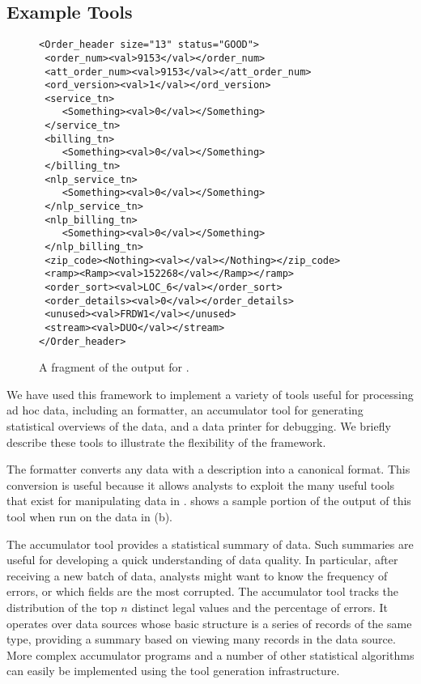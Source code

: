 \subsection{Example Tools}
\label{sec:gentool-motivation-ex}

\begin{figure}
  \centering
  \scriptsize
\begin{verbatim}
<Order_header size="13" status="GOOD">
 <order_num><val>9153</val></order_num>
 <att_order_num><val>9153</val></att_order_num>
 <ord_version><val>1</val></ord_version>
 <service_tn>
    <Something><val>0</val></Something>
 </service_tn>
 <billing_tn>
    <Something><val>0</val></Something>
 </billing_tn>
 <nlp_service_tn>
    <Something><val>0</val></Something>
 </nlp_service_tn>
 <nlp_billing_tn>
    <Something><val>0</val></Something>
 </nlp_billing_tn>
 <zip_code><Nothing><val></val></Nothing></zip_code>
 <ramp><Ramp><val>152268</val></Ramp></ramp>
 <order_sort><val>LOC_6</val></order_sort>
 <order_details><val>0</val></order_details>
 <unused><val>FRDW1</val></unused>
 <stream><val>DUO</val></stream>
</Order_header>
\end{verbatim}  
  \caption{A fragment of the \xml{} output for \dibbler{}. }
  \label{fig:gentool-xml-output}
\end{figure}

We have used this framework to implement a variety of tools useful for processing ad hoc data, including an \xml{} formatter, an accumulator tool for generating statistical overviews of the data, and a data printer for debugging.  We briefly describe these tools to illustrate the flexibility of the framework.

The \xml{} formatter converts any data with a \padsml{} description into a canonical \xml{} format.  This conversion is useful because it allows analysts to exploit the many useful tools that exist for manipulating data in \xml{}.   shows a sample portion of the output of this tool when run on the \dibbler{} data in (b).  

The accumulator tool provides a statistical summary of data.
Such summaries are useful for developing a quick understanding of data quality.  In particular, after receiving a new batch of data, analysts might want to know the frequency of errors, or which fields are the most corrupted. 
The accumulator tool tracks the distribution of the top $n$
distinct legal values and the percentage of errors. 
It operates over data sources
whose basic structure is a series of records of the same type, 
providing a summary based on viewing many records
in the data source.    More complex accumulator programs and a number of other statistical algorithms can easily be implemented using the tool generation infrastructure.

